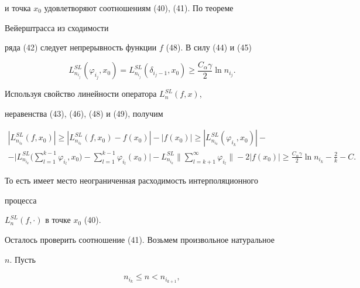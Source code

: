 \begin{pf}
и точка $x_0$ удовлетворяют соотношениям (40), (41). По теореме 


Вейерштрасса из сходимости 


ряда (42) следует непрерывность функции $f$ (48). В силу (44) и (45) 


\begin{equation} 


L^{SL}_{n_{i_j}}(\varphi_{i_j},x_0)= 


L^{SL}_{n_{i_j}}(\delta_{i_j-1},x_0)\ge 


\frac{C_\alpha\gamma}{2}\ln n_{i_j}. 


\end{equation} 


Используя свойство линейности оператора $L^{SL}_n(f,x)$, 


неравенства (43), (46), (48) и (49), получим 


\begin{multline*} 


|L^{SL}_{n_{i_k}}(f,x_0)|\ge 


|L^{SL}_{n_{i_k}}(f,x_0)-f(x_0)|-|f(x_0)|\ge 


|L^{SL}_{n_{i_k}}(\varphi_{i_k},x_0)|- \\


%


-\bigg| L^{SL}_{n_{i_k}}\bigg(\sum^{k-1}_{l=1}\varphi_{i_l},x_0\bigg)- 


\sum^{k-1}_{l=1}\varphi_{i_l}(x_0)\bigg|-


L^{SL}_{n_{i_k}}\bigg\|\sum^\infty_{l=k+1}\varphi_{i_l}\bigg\| 


-2|f(x_0)|\ge\frac{C_\alpha\gamma}{2}\ln n_{i_k}- 


\frac{2}{k}-C. 


\end{multline*} 


То есть имеет место неограниченная расходимость интерполяционного 


процесса 


$L^{SL}_n(f,\cdot)$ в точке $x_0$ (40). 


 


Осталось проверить соотношение (41). Возьмем произвольное натуральное 


$n$. Пусть 


\begin{equation} 


n_{i_k}\le n<n_{i_{k+1}}, 


\end{equation} 



\end{pf}
